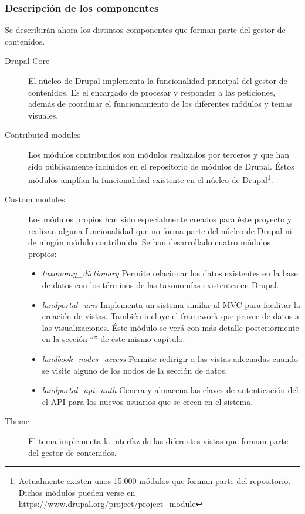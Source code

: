 \subsubsection{Descripción de los componentes}
Se describirán ahora los distintos componentes que forman parte del gestor de contenidos.
\begin{description}
	\item[Drupal Core]  El núcleo de Drupal implementa la funcionalidad principal del gestor de contenidos.  Es el encargado de procesar y responder a las peticiones, además de coordinar el funcionamiento de los diferentes módulos y temas visuales.
	\item[Contributed modules]  Los módulos contribuidos son módulos realizados por terceros y que han sido públicamente incluidos en el repositorio de módulos de Drupal.  Éstos módulos amplían la funcionalidad existente en el núcleo de Drupal\footnote{Actualmente existen unos 15.000 módulos que forman parte del repositorio.  Dichos módulos pueden verse en \url{https://www.drupal.org/project/project_module}}.
	\item[Custom modules]  Los módulos propios han sido especialmente creados para éste proyecto y realizan alguna funcionalidad que no forma parte del núcleo de Drupal ni de ningún módulo contribuido.  Se han desarrollado cuatro módulos propios:
		\begin{itemize}
			\item \textit{taxonomy\_dictionary}  Permite relacionar los datos existentes en la base de datos con los términos de las taxonomías existentes en Drupal.
			\item \textit{landportal\_uris}  Implementa un sistema similar al MVC para facilitar la creación de vistas.  También incluye el framework que provee de datos a las visualizaciones.  Éste módulo se verá con más detalle posteriormente en la sección ``'' de éste mismo capítulo.
			\item \textit{landbook\_nodes\_access}  Permite redirigir a las vistas adecuadas cuando se visite alguno de los nodos de la sección de datos.
			\item \textit{landportal\_api\_auth}  Genera y almacena las claves de autenticación del el API para los nuevos usuarios que se creen en el sistema.
		\end{itemize}
	\item[Theme]  El tema implementa la interfaz de las diferentes vistas que forman parte del gestor de contenidos.
\end{description}


